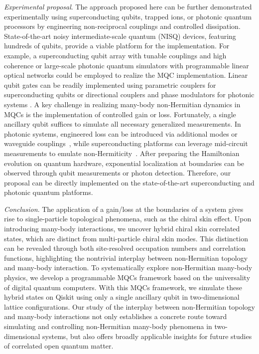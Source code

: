 \documentclass[longbibliography, aps, prx, amsmath, amssymb, amsfonts, twocolumn,superscriptaddress, footinbib]{revtex4-1}
\begin{document}
	\textit{Experimental proposal}. The approach proposed here can be further demonstrated experimentally using superconducting qubits, trapped ions, or photonic quantum processors by engineering non-reciprocal couplings and controlled dissipation. State-of-the-art noisy intermediate-scale quantum (NISQ) devices, featuring hundreds of qubits, provide a viable platform for the implementation. For example, a superconducting qubit array with tunable couplings and high coherence \cite{guo2021observation, preskill2018quantum, wu2021strong} or large-scale photonic quantum simulators with programmable linear optical networks \cite{zhong2020quantum, madsen2022quantum, zhu2024dynamically} could be employed to realize the MQC implementation. Linear qubit gates can be readily implemented using parametric couplers for superconducting qubits or directional couplers and phase modulators for photonic systems \cite{zhu2024large}. A key challenge in realizing many-body non-Hermitian dynamics in MQCs is the implementation of controlled gain or loss. Fortunately, a single ancillary qubit suffices to simulate all necessary generalized measurements. In photonic systems, engineered loss can be introduced via additional modes or waveguide couplings~\cite{hoch2025quantum, carolan2020variational}, while superconducting platforms can leverage mid-circuit measurements to emulate non-Hermiticity~\cite{shen2024enhanced,shen2025observation}. After preparing the Hamiltonian evolution on quantum hardware, exponential localization at boundaries can be observed through qubit measurements or photon detection. Therefore, our proposal can be directly implemented on the state-of-the-art superconducting and photonic quantum platforms. 

	\textit{Conclusion}. The application of a gain/loss at the boundaries of a system gives rise to single-particle topological phenomena, such as the chiral skin effect. Upon introducing many-body interactions, we uncover hybrid chiral skin correlated states, which are distinct from multi-particle chiral skin modes. This distinction can be revealed through both site-resolved occupation numbers and correlation functions, highlighting the nontrivial interplay between non-Hermitian topology and many-body interaction. 
	To systematically explore non-Hermitian many-body physics, we develop a programmable MQCs framework based on the universality of digital quantum computers. 
	With this MQCs framework, we simulate these hybrid states on Qiskit using only a single ancillary qubit in two-dimensional lattice configurations. 
	Our study of the interplay between non-Hermitian topology and many-body interactions not only establishes a concrete route toward simulating and controlling non-Hermitian many-body phenomena in two-dimensional systems, but also offers broadly applicable insights for future studies of correlated open quantum matter.
\end{document}
